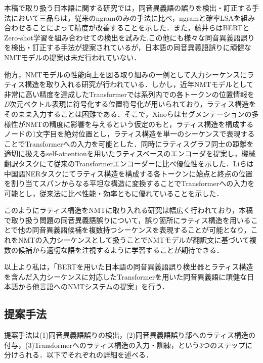\documentclass[a4j,10pt, twocolumn]{jarticle} \usepackage[dvipdfmx]{graphicx} \usepackage{amssymb} \usepackage{amsmath}
\begin{document}
本稿で取り扱う日本語に関する研究では，同音異義語の誤りを検出・訂正する手法において三品ら\cite{Mishina}は，従来のngramのみの手法に比べ，ngramと確率LSAを組み合わせることによって精度が改善することを示した．また，藤井ら\cite{Fujii}はBERTとZero-shot学習を組み合わせての検出を試みた.この他にも様々な同音異義語誤りを検出・訂正する手法が提案されているが，日本語の同音異義語誤りに頑健なNMTモデルの提案は未だ行われていない．

他方，NMTモデルの性能向上を図る取り組みの一例として入力シーケンスにラティス構造を取り入れる研究が行われている．しかし，近年NMTモデルとして非常に高い精度を達成したTransformerでは系列内での各トークンの位置情報を\textit{D}次元ベクトル表現に符号化する位置符号化が用いられており\cite{Vaswani}，ラティス構造をそのまま入力することは困難である\cite{Xiao}．そこで，Xiaoら\cite{Xiao}はセグメンテーションの多様性がNMTの精度に影響を与えるという仮定のもと，ラティス構造を構成するノードの1文字目を絶対位置とし，ラティス構造を単一のシーケンスで表現することでTransformerへの入力を可能とした．同時にラティスグラフ同士の距離を適切に扱えるself-attentionを用いたラティスベースのエンコーダを提案し，機械翻訳タスクにて従来のTransformerエンコーダーに比べ優位性を示した．Liら\cite{Li}は中国語NERタスクにてラティス構造を構成する各トークンに始点と終点の位置を割り当てスパンからなる平坦な構造に変換することでTransformerへの入力を可能とし，従来法に比べ性能・効率ともに優れていることを示した．

このようにラティス構造をNMTに取り入れる研究は幅広く行われており，本稿で取り扱う問題の同音異義語誤りについて，誤り箇所にラティス構造を用いることで他の同音異義語候補を複数持つシーケンスを表現することが可能となり，これをNMTの入力シーケンスとして扱うことでNMTモデルが翻訳文に基づいて複数の候補から適切な語を注視するように学習することが期待できる．

以上より私は，「BERTを用いた日本語の同音異義語誤り検出器とラティス構造を含んだ入力シーケンスに対応したTransformerを用いた同音異義語に頑健な日本語から他言語へのNMTシステムの提案」を行う．

\subsection{提案手法}
提案手法は(1)同音異義語誤りの検出，(2)同音異義語誤り部へのラティス構造の付与，(3)Transformerへのラティス構造の入力・訓練，という3つのステップに分けられる．以下でそれぞれの詳細を述べる．
\end{document}
